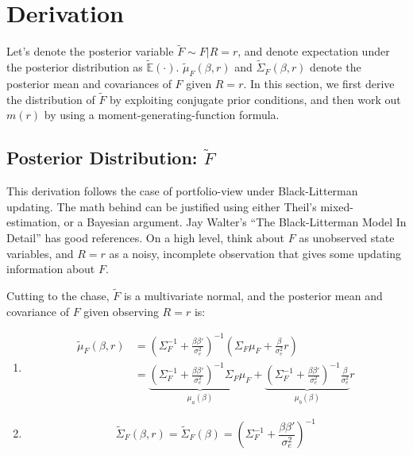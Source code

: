 \documentclass[pdftex,12pt,a4paper]{article}
\begin{document}
\section{Derivation}

Let's denote the posterior variable $\tilde{F} \sim F | R = r$, and denote expectation under the posterior distribution as $\tilde{\mathbb{E}}(\cdot)$. $\tilde{\mu}_F(\beta, r)$ and $\tilde{\Sigma}_F(\beta, r)$ denote the posterior mean and covariances of $F$ given $R = r$. In this section, we first derive the distribution of $\tilde{F}$ by exploiting conjugate prior conditions, and then work out $m(r)$ by using a moment-generating-function formula. 

\subsection{Posterior Distribution: $\tilde{F}$}

This derivation follows the case of portfolio-view under Black-Litterman updating. The math behind can be justified using either Theil's mixed-estimation, or a Bayesian argument. Jay Walter's ``The Black-Litterman Model In Detail'' has good references. On a high level, think about $F$ as unobserved state variables, and $R = r$ as a noisy, incomplete observation that gives some updating information about $F$. 

Cutting to the chase, $\tilde{F}$ is a multivariate normal, and the posterior mean and covariance of $F$ given observing $R = r$ is:

\begin{enumerate}
\item 
\begin{align}
\tilde{\mu}_F(\beta, r) & = (\Sigma_F^{-1} + \frac{\beta \beta'}{\sigma^2_e})^{-1} (\Sigma_F \mu_F + \frac{\beta}{\sigma^2_e} r) \\
& = \underbrace{(\Sigma_F^{-1} + \frac{\beta \beta'}{\sigma^2_e})^{-1} \Sigma_F \mu_F}_{\mu_a(\beta)} + \underbrace{(\Sigma_F^{-1} + \frac{\beta \beta'}{\sigma^2_e})^{-1} \frac{\beta}{\sigma^2_e}}_{\mu_b(\beta)} r \label{posteriorMean}
\end{align}

\item 
\begin{equation}
\tilde{\Sigma}_F(\beta, r) = \tilde{\Sigma}_F(\beta) = (\Sigma_F^{-1} + \frac{\beta \beta'}{\sigma^2_e})^{-1} \label{posteriorCovariance}
\end{equation}
\end{enumerate}
\end{document}
